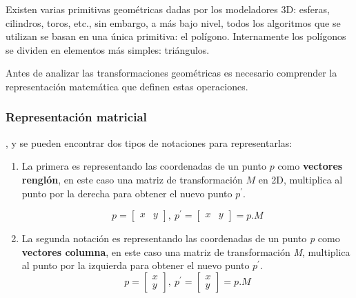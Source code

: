 Existen varias primitivas geométricas dadas por los modeladores 3D: esferas, cilindros, toros, etc., sin embargo, a más bajo nivel, todos los algoritmos que se utilizan se basan en una única primitiva: el polígono. Internamente los polígonos se dividen en elementos más simples: triángulos.

Antes de analizar las transformaciones geométricas es necesario comprender la representación matemática que definen estas operaciones.

\subsubsection{Representación matricial}

 \citep{Matias2007}, y se pueden encontrar dos tipos de notaciones para representarlas:
\begin{enumerate}
    \item La primera es representando las coordenadas de un punto $p$ como \textbf{vectores renglón}, en este caso una matriz de transformación $M$ en 2D, multiplica al punto por la derecha para obtener el nuevo punto $p^\prime$. 

    \begin{equation}
       p = \begin{bmatrix}
           x & y         
         \end{bmatrix}, \ p^{\prime} = \begin{bmatrix}
           x & y         
         \end{bmatrix}= p.M  
    \end{equation} 
    
    \item La segunda notación es representando las coordenadas de un punto \textit{p} como \textbf{vectores columna}, en este caso una matriz de transformación \textit{M}, multiplica al punto por la izquierda para obtener el nuevo punto $p^{\prime}$.
\begin{equation}
     p = \begin{bmatrix}
       x \\ y         
     \end{bmatrix}, \ p^{\prime} = \begin{bmatrix}
       x \\ y           
     \end{bmatrix}= p.M 
\end{equation}
\end{enumerate}
     

